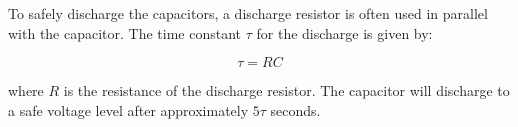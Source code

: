 To safely discharge the capacitors, a discharge resistor is often used in parallel with the capacitor. The time constant \(\tau\) for the discharge is given by:

\[
\tau = R C
\]

where \(R\) is the resistance of the discharge resistor. The capacitor will discharge to a safe voltage level after approximately \(5\tau\) seconds.

